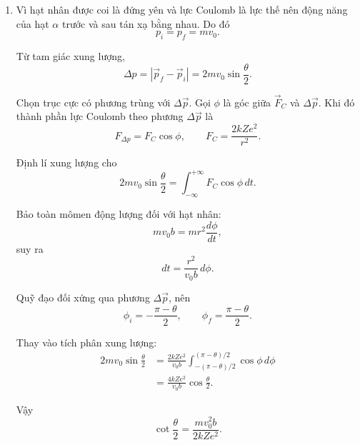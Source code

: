 \documentclass[12pt,a4paper]{article}
\begin{document}
\begin{enumerate}[leftmargin=*,itemsep=1em]

\item
Vì hạt nhân được coi là đứng yên và lực Coulomb là lực thế nên động năng của hạt
$\alpha$ trước và sau tán xạ bằng nhau. Do đó
$$
p_i=p_f=mv_0.
$$

Từ tam giác xung lượng,
$$
\Delta p=\left|\vec p_f-\vec p_i\right|
=2mv_0\sin\frac{\theta}{2}.
$$

Chọn trục cực có phương trùng với $\Delta\vec p$. Gọi $\phi$ là góc giữa
$\vec F_C$ và $\Delta\vec p$. Khi đó thành phần lực Coulomb theo phương
$\Delta\vec p$ là
$$
F_{\Delta p}=F_C\cos\phi,
\qquad
F_C=\frac{2kZe^2}{r^2}.
$$

Định lí xung lượng cho
$$
2mv_0\sin\frac{\theta}{2}
=\int_{-\infty}^{+\infty}F_C\cos\phi\,dt.
$$

Bảo toàn mômen động lượng đối với hạt nhân:
$$
mv_0b=mr^2\frac{d\phi}{dt},
$$
suy ra
$$
dt=\frac{r^2}{v_0b}\,d\phi.
$$

Quỹ đạo đối xứng qua phương $\Delta\vec p$, nên
$$
\phi_i=-\frac{\pi-\theta}{2},
\qquad
\phi_f=\frac{\pi-\theta}{2}.
$$

Thay vào tích phân xung lượng:
$$
\begin{aligned}
2mv_0\sin\frac{\theta}{2}
&=\frac{2kZe^2}{v_0b}
\int_{-(\pi-\theta)/2}^{(\pi-\theta)/2}\cos\phi\,d\phi\\
&=\frac{4kZe^2}{v_0b}\cos\frac{\theta}{2}.
\end{aligned}
$$

Vậy
$$
\boxed{\cot\frac{\theta}{2}
=\frac{mv_0^2b}{2kZe^2}}.
$$

\begin{center}
\end{center}
\end{enumerate}
\end{document}
